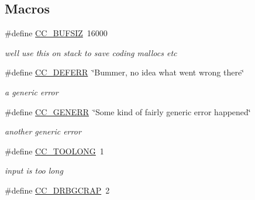\subsection*{Macros}
\begin{DoxyCompactItemize}
\item 
\mbox{\label{cs2014coin-int_8h_a0f085055294117dfcbd472c7822b0e23}} 
\#define \hyperlink{cs2014coin-int_8h_a0f085055294117dfcbd472c7822b0e23}{C\+C\+\_\+\+B\+U\+F\+S\+IZ}~16000
\begin{DoxyCompactList}\small\item\em we\textquotesingle{}ll use this on stack to save coding mallocs etc \end{DoxyCompactList}\item 
\mbox{\label{cs2014coin-int_8h_a1a3f34ffaae00f1c83da9a7c63170cb0}} 
\#define \hyperlink{cs2014coin-int_8h_a1a3f34ffaae00f1c83da9a7c63170cb0}{C\+C\+\_\+\+D\+E\+F\+E\+RR}~\char`\"{}Bummer, no idea what went wrong there\char`\"{}
\begin{DoxyCompactList}\small\item\em a generic error \end{DoxyCompactList}\item 
\mbox{\label{cs2014coin-int_8h_a6160fdc571466ec7d48a39c9fc708af3}} 
\#define \hyperlink{cs2014coin-int_8h_a6160fdc571466ec7d48a39c9fc708af3}{C\+C\+\_\+\+G\+E\+N\+E\+RR}~\char`\"{}Some kind of fairly generic error happened\char`\"{}
\begin{DoxyCompactList}\small\item\em another generic error \end{DoxyCompactList}\item 
\mbox{\label{cs2014coin-int_8h_a3c59fec65b0487d41c9c642ff283f175}} 
\#define \hyperlink{cs2014coin-int_8h_a3c59fec65b0487d41c9c642ff283f175}{C\+C\+\_\+\+T\+O\+O\+L\+O\+NG}~1
\begin{DoxyCompactList}\small\item\em input is too long \end{DoxyCompactList}\item 
\mbox{\label{cs2014coin-int_8h_a3c13d1329b1f863c15fd4b83411c2d95}} 
\#define \hyperlink{cs2014coin-int_8h_a3c13d1329b1f863c15fd4b83411c2d95}{C\+C\+\_\+\+D\+R\+B\+G\+C\+R\+AP}~2

\end{DoxyCompactItemize}
